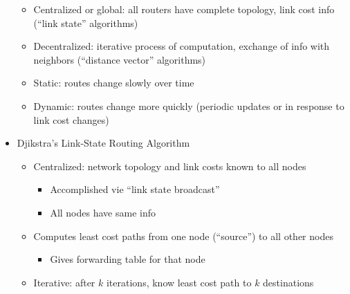 \begin{itemize}
    \begin{itemize}

      \item Centralized or global: all routers have complete topology, link cost info (``link state'' algorithms)

      \item Decentralized: iterative process of computation, exchange of info with neighbors (``distance vector'' algorithms)

      \item Static: routes change slowly over time

      \item Dynamic: routes change more quickly (periodic updates or in response to link cost changes)

    \end{itemize}

  \item Djikstra's Link-State Routing Algorithm

    \begin{itemize}

      \item Centralized: network topology and link costs known to all nodes

        \begin{itemize}

          \item Accomplished vie ``link state broadcast''

          \item All nodes have same info

        \end{itemize}

      \item Computes least cost paths from one node (``source'') to all other nodes

        \begin{itemize}

          \item Gives forwarding table for that node

        \end{itemize}

      \item Iterative: after $k$ iterations, know least cost path to $k$ destinations

    \end{itemize}

\end{itemize}




